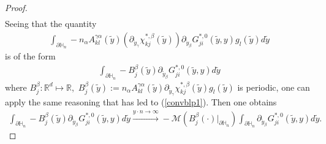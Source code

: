 \documentclass[11pt, reqno]{amsart}
\theoremstyle{definition}
\theoremstyle{remark}
\numberwithin{equation}{section}
\begin{document}
\begin{proof}[Proof]
\begin{align*}
		\end{align*}
		Seeing that the quantity 
		\begin{align*}
			\int_{\partial\mathbb{H}_n}-n_\alpha A^{\gamma\alpha}_{kl}(\tilde{y})\left(\partial_{ \tilde{y}_\gamma} \chi_{kj}^{*,\beta}\left(\tilde{y} \right)  \right) \partial_{ \tilde{y}_\beta} G^{*,0}_{ji}\left(\tilde{y},y\right)  g_l(\tilde{y}) d\tilde{y}
		\end{align*}
		 is of the form 
		\begin{align*}
			\int_{\partial\mathbb{H}_n}-B_{j}^{\beta}(\tilde{y})\partial_{ \tilde{y}_\beta} G^{*,0}_{ji}(\tilde{y},y) d\tilde{y}
		\end{align*}
		where $B_j^{\beta}:\mathbb{R}^d \longmapsto \mathbb{R}$,\,  $B_j^{\beta}(\tilde{y}):=n_\alpha A^{\gamma\alpha}_{kl}(\tilde{y})\partial_{ \tilde{y}_\gamma} \chi_{kj}^{*,\beta}(\tilde{y}) g_l(\tilde{y}) $ is periodic, one can apply the same reasoning  that has led to (\ref{convblp1}). Then one obtains
		\begin{align*}
			\int_{\partial\mathbb{H}_n} -B_{j}^{\beta}(\tilde{y})\partial_{ \tilde{y}_\beta} G^{*,0}_{ji}(\tilde{y},y) d\tilde{y}  \xrightarrow{y\cdot n\rightarrow \infty}-\mathcal{M}(B_{j}^{\beta}(\cdot)|_{\partial\mathbb{H}_n})
			\int_{\partial\mathbb{H}_n} \partial_{ \tilde{y}_\beta} G^{*,0}_{ji}(\tilde{y},y) d\tilde{y} .
		\end{align*}
		

\end{proof}
\end{document}
